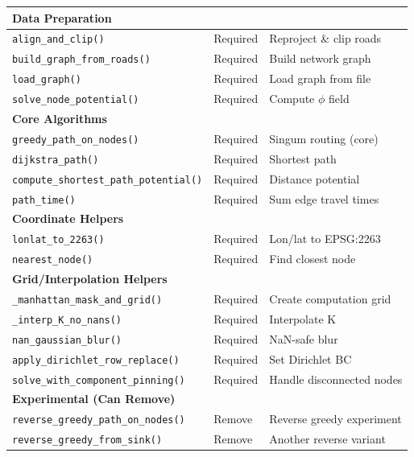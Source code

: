\documentclass[11pt]{article}
\begin{document}
\begin{longtable}{p{5.5cm}p{2cm}p{6cm}}
\multicolumn{3}{l}{\textbf{Data Preparation}} \\
\midrule
\texttt{align\_and\_clip()} & \textcolor{required}{Required} & Reproject \& clip roads \\
\texttt{build\_graph\_from\_roads()} & \textcolor{required}{Required} & Build network graph \\
\texttt{load\_graph()} & \textcolor{required}{Required} & Load graph from file \\
\texttt{solve\_node\_potential()} & \textcolor{required}{Required} & Compute $\phi$ field \\
\midrule

\multicolumn{3}{l}{\textbf{Core Algorithms}} \\
\midrule
\texttt{greedy\_path\_on\_nodes()} & \textcolor{required}{Required} & Singum routing (core) \\
\texttt{dijkstra\_path()} & \textcolor{required}{Required} & Shortest path \\
\texttt{compute\_shortest\_path\_potential()} & \textcolor{required}{Required} & Distance potential \\
\texttt{path\_time()} & \textcolor{required}{Required} & Sum edge travel times \\
\midrule

\multicolumn{3}{l}{\textbf{Coordinate Helpers}} \\
\midrule
\texttt{lonlat\_to\_2263()} & \textcolor{required}{Required} & Lon/lat to EPSG:2263 \\
\texttt{nearest\_node()} & \textcolor{required}{Required} & Find closest node \\
\midrule

\multicolumn{3}{l}{\textbf{Grid/Interpolation Helpers}} \\
\midrule
\texttt{\_manhattan\_mask\_and\_grid()} & \textcolor{required}{Required} & Create computation grid \\
\texttt{\_interp\_K\_no\_nans()} & \textcolor{required}{Required} & Interpolate K \\
\texttt{nan\_gaussian\_blur()} & \textcolor{required}{Required} & NaN-safe blur \\
\texttt{apply\_dirichlet\_row\_replace()} & \textcolor{required}{Required} & Set Dirichlet BC \\
\texttt{solve\_with\_component\_pinning()} & \textcolor{required}{Required} & Handle disconnected nodes \\
\midrule

\multicolumn{3}{l}{\textbf{Experimental (Can Remove)}} \\
\midrule
\texttt{reverse\_greedy\_path\_on\_nodes()} & \textcolor{unused}{Remove} & Reverse greedy experiment \\
\texttt{reverse\_greedy\_from\_sink()} & \textcolor{unused}{Remove} & Another reverse variant \\
\bottomrule
\end{longtable}
\end{document}
